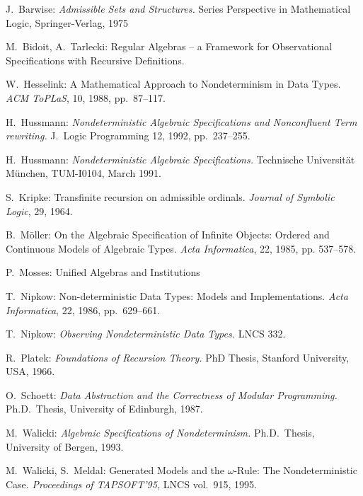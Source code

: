 %
%
\begin{thebibliography}{Nip 86}

    J.~Barwise: {\em Admissible Sets and Structures.}
       Series Perspective in Mathematical Logic, Springer-Verlag, 1975

    M.~Bidoit, A.~Tarlecki: Regular Algebras -- a
       Framework for Observational Specifications with Recursive Definitions.

    W.\ Hesselink: A Mathematical Approach to
       Nondeterminism in Data Types. {\em ACM ToPLaS},
       10, 1988, pp.\ 87--117.

    H.\ Hussmann: {\em Nondeterministic Algebraic
       Specifications and Nonconfluent Term rewriting.} J.\ Logic Programming
       12, 1992, pp.\ 237--255.

    H.\ Hussmann: {\em Nondeterministic Algebraic
       Specifications.} Technische Universit\"{a}t M\"{u}nchen, TUM-I0104,
       March 1991.

    S.~Kripke: Transfinite recursion on admissible ordinals. 
       {\em Journal of Symbolic Logic}, 29, 1964.

    B.~M\"{o}ller: On the Algebraic Specification of
   Infinite Objects: Ordered and Continuous Models of Algebraic Types. {\em
   Acta Informatica}, 22, 1985, pp. 537--578.

    P.~Mosses: Unified Algebras and Institutions

    T.\ Nipkow: Non-deterministic Data Types: 
       Models and Implementations. {\em Acta Informatica}, 22, 1986, pp.\ 629--661.

    T.\ Nipkow: {\em Observing Nondeterministic Data
       Types.} LNCS 332.

    R.~Platek: {\em Foundations of Recursion Theory.} PhD Thesis,
       Stanford University, USA, 1966.

    O.\ Schoett: {\em Data Abstraction and the 
       Correctness of Modular Programming.} Ph.D.\ Thesis, University of
       Edinburgh, 1987.

    M.\ Walicki: {\em Algebraic Specifications of 
       Nondeterminism.} Ph.D.\ Thesis, University of Bergen, 1993.

    M.~Walicki, S.~Meldal: Generated Models and the $\omega$-Rule:
       The Nondeterministic Case. {\em Proceedings of TAPSOFT'95,} LNCS vol.~915, 1995.
       
\end{thebibliography}





